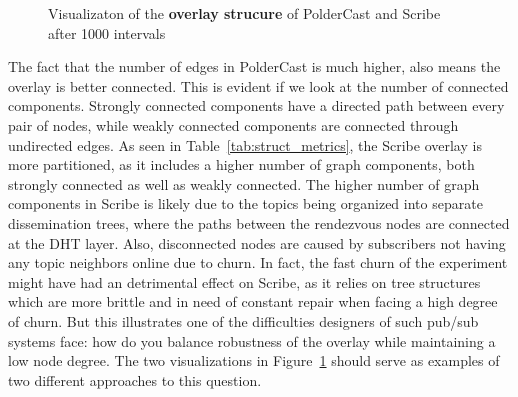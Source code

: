 \begin{figure}
{    }
    \caption{Visualizaton of the \textbf{overlay
            strucure} of PolderCast and Scribe after 1000 intervals}
    \label{fig:struct}
\end{figure}

The fact that the number of edges in PolderCast is much higher, also
means the overlay is better connected. This is evident if we look at the
number of connected components. Strongly connected components have a
directed path between every pair of nodes, while weakly connected
components are connected through undirected edges. As seen in
Table~\ref{tab:struct_metrics}, the Scribe overlay is more partitioned,
as it includes a higher number of graph components, both strongly
connected as well as weakly connected. The higher number of graph
components in Scribe is likely due to the topics being organized into
separate dissemination trees, where the paths between the rendezvous
nodes are connected at the DHT layer. Also, disconnected nodes are
caused by subscribers not having any topic neighbors online due to
churn. In fact, the fast churn of the experiment might have had an
detrimental effect on Scribe, as it relies on tree structures which are more
brittle and in need of constant repair when facing a high degree of
churn. But this illustrates one of the difficulties designers of such
pub/sub systems face: how do you balance robustness of the overlay while
maintaining a low node degree. The two visualizations in
Figure~\ref{fig:struct} should serve as examples of two different
approaches to this question.

